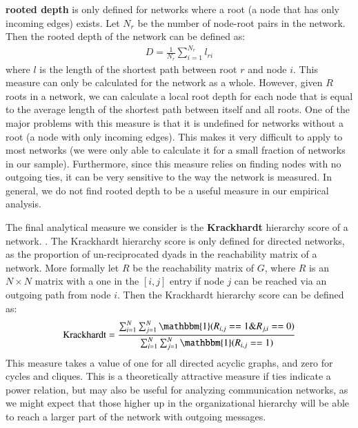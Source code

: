 \documentclass[3p,times]{elsarticle}
\begin{document}
\textbf{rooted depth} \cite{Suchecki2013a} is only defined for networks where a root (a node that has only incoming edges) exists. Let $N_{r}$ be the number of node-root pairs in the network. Then the rooted depth of the network can be defined as:
\begin{align}
	D=\frac{1}{N_{r}}\sum_{i=1}^{N_r}{l_{ri}}
\end{align}
where $l$ is the length of the shortest path between root $r$ and node $i$. This measure can only be calculated for the network as a whole. However, given $R$ roots in a network, we can calculate a local root depth for each node that is equal to the average length of the shortest path between itself and all roots. One of the major problems with this measure is that it is undefined for networks without a root (a node with only incoming edges). This makes it very difficult to apply to most networks (we were only able to calculate it for a small fraction of networks in our sample). Furthermore, since this measure relies on finding nodes with no outgoing ties, it can be very sensitive to the way the network is measured. In general, we do not find rooted depth to be a useful measure in our empirical analysis.

The final analytical measure we consider is the \textbf{Krackhardt} hierarchy score of a network. \cite{Krackhardt1994}. The Krackhardt hierarchy score is only defined for directed networks, as the proportion of un-reciprocated dyads in the reachability matrix of a network. More formally let $R$ be the reachability matrix of $G$, where $R$ is an $N \times N$ matrix with a one in the $[i,j]$ entry if node $j$ can be reached via an outgoing path from node $i$. Then the Krackhardt hierarchy score can be defined as:
\begin{align}
	\text{Krackhardt} = \frac{\sum_{i = 1}^N \sum_{j = 1}^N \mathbbm{1}(R_{i,j} == 1 \& R_{j,i} == 0)}{\sum_{i = 1}^N \sum_{j = 1}^N \mathbbm{1}(R_{i,j} == 1)}
\end{align}
This measure takes a value of one for all directed acyclic graphs, and zero for cycles and cliques. This is a theoretically attractive measure if ties indicate a power relation, but may also be useful for analyzing communication networks, as we might expect that those higher up in the organizational hierarchy will be able to reach a larger part of the network with outgoing messages. 
\end{document}
